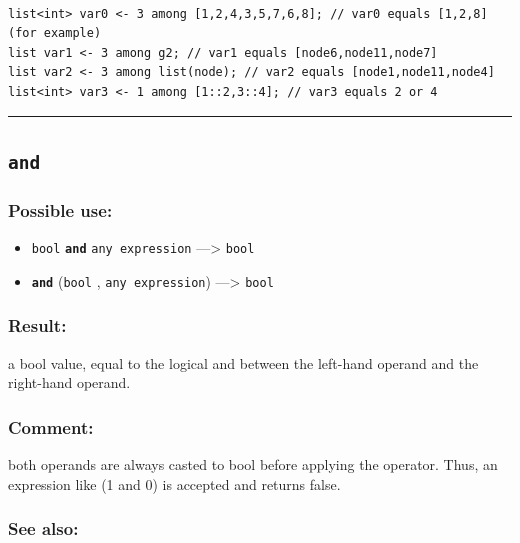 \documentclass[]{book}
\providecommand{\tightlist}{%
  \setlength{\itemsep}{0pt}\setlength{\parskip}{0pt}}
\theoremstyle{definition}
\theoremstyle{definition}
\theoremstyle{definition}
\theoremstyle{remark}
\begin{document}
\begin{verbatim}
 
list<int> var0 <- 3 among [1,2,4,3,5,7,6,8]; // var0 equals [1,2,8] (for example) 
list var1 <- 3 among g2; // var1 equals [node6,node11,node7] 
list var2 <- 3 among list(node); // var2 equals [node1,node11,node4] 
list<int> var3 <- 1 among [1::2,3::4]; // var3 equals 2 or 4
\end{verbatim}

\begin{center}\rule{0.5\linewidth}{\linethickness}\end{center}

\subsection{\texorpdfstring{\texttt{and}}{and}}\label{and}

\subsubsection{Possible use:}\label{possible-use-35}

\begin{itemize}
\tightlist
\item
  \texttt{bool} \textbf{\texttt{and}} \texttt{any\ expression}
  ---\textgreater{} \texttt{bool}
\item
  \textbf{\texttt{and}} (\texttt{bool} , \texttt{any\ expression})
  ---\textgreater{} \texttt{bool}
\end{itemize}

\subsubsection{Result:}\label{result-34}

a bool value, equal to the logical and between the left-hand operand and
the right-hand operand.

\subsubsection{Comment:}\label{comment-6}

both operands are always casted to bool before applying the operator.
Thus, an expression like (1 and 0) is accepted and returns false.

\subsubsection{See also:}\label{see-also-25}
\end{document}
